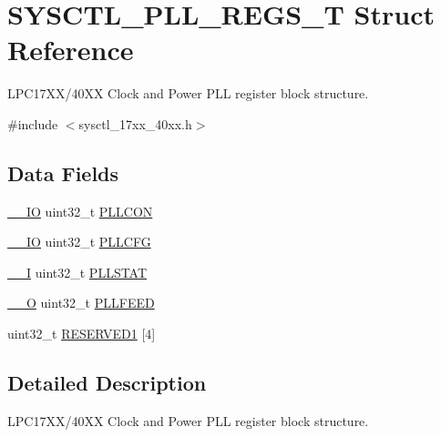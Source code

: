 \hypertarget{structSYSCTL__PLL__REGS__T}{\section{S\-Y\-S\-C\-T\-L\-\_\-\-P\-L\-L\-\_\-\-R\-E\-G\-S\-\_\-\-T Struct Reference}
\label{structSYSCTL__PLL__REGS__T}
}


L\-P\-C17\-X\-X/40\-X\-X Clock and Power P\-L\-L register block structure.  




{\ttfamily \#include $<$sysctl\-\_\-17xx\-\_\-40xx.\-h$>$}

\subsection*{Data Fields}
\begin{DoxyCompactItemize}
\item 
\hyperlink{core__cm3_8h_aec43007d9998a0a0e01faede4133d6be}{\-\_\-\-\_\-\-I\-O} uint32\-\_\-t \hyperlink{structSYSCTL__PLL__REGS__T_a1fb97445f7a92913133769bb098df316}{P\-L\-L\-C\-O\-N}
\item 
\hyperlink{core__cm3_8h_aec43007d9998a0a0e01faede4133d6be}{\-\_\-\-\_\-\-I\-O} uint32\-\_\-t \hyperlink{structSYSCTL__PLL__REGS__T_a7f6a92521303bcd5522acdac74af3210}{P\-L\-L\-C\-F\-G}
\item 
\hyperlink{core__cm3_8h_af63697ed9952cc71e1225efe205f6cd3}{\-\_\-\-\_\-\-I} uint32\-\_\-t \hyperlink{structSYSCTL__PLL__REGS__T_a9cc1486fbc5a9888ccdd70df2b57ebec}{P\-L\-L\-S\-T\-A\-T}
\item 
\hyperlink{core__cm3_8h_a7e25d9380f9ef903923964322e71f2f6}{\-\_\-\-\_\-\-O} uint32\-\_\-t \hyperlink{structSYSCTL__PLL__REGS__T_a658116aa66b1d9e27f12cf0e429663f7}{P\-L\-L\-F\-E\-E\-D}
\item 
uint32\-\_\-t \hyperlink{structSYSCTL__PLL__REGS__T_a8f564110c46a5fba4e6d306cd4137bd3}{R\-E\-S\-E\-R\-V\-E\-D1} \mbox{[}4\mbox{]}
\end{DoxyCompactItemize}


\subsection{Detailed Description}
L\-P\-C17\-X\-X/40\-X\-X Clock and Power P\-L\-L register block structure. 

